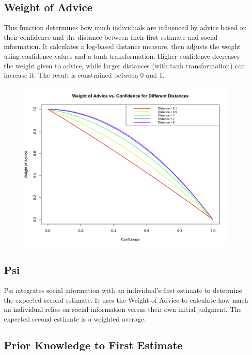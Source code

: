 \documentclass[
  man,floatsintext]{apa6}
\begin{document}
\hypertarget{weight-of-advice}{%
\subsection{Weight of Advice}\label{weight-of-advice}}

This function determines how much individuals are influenced by advice based on their confidence and the distance between their first estimate and social information. It calculates a log-based distance measure, then adjusts the weight using confidence values and a tanh transformation. Higher confidence decreases the weight given to advice, while larger distances (with tanh transformation) can increase it. The result is constrained between 0 and 1.

\begin{figure}[H]
\includegraphics[width=5.36in]{photos/woa} \caption{ }\label{fig:unnamed-chunk-3}
\end{figure}

\hypertarget{psi}{%
\subsection{Psi}\label{psi}}

Psi integrates social information with an individual's first estimate to determine the expected second estimate. It uses the Weight of Advice to calculate how much an individual relies on social information versus their own initial judgment. The expected second estimate is a weighted average.

\hypertarget{prior-knowledge-to-first-estimate}{%
\subsection{Prior Knowledge to First Estimate}\label{prior-knowledge-to-first-estimate}}
\end{document}
